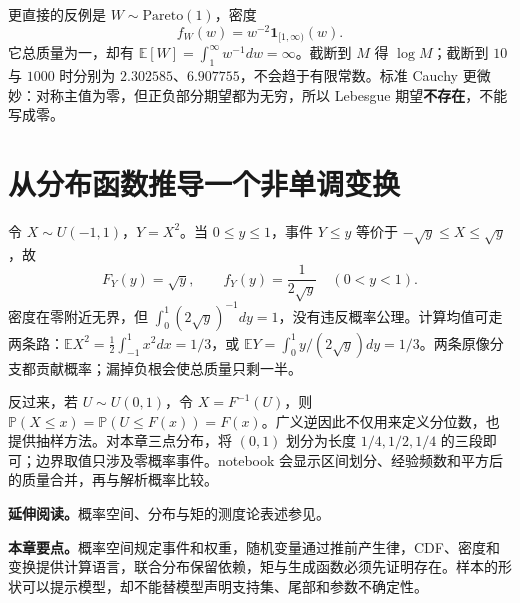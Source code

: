 更直接的反例是 $W\sim\mathrm{Pareto}(1)$，密度
\[
 f_W(w)=w^{-2}\mathbf1_{[1,\infty)}(w).
\]
它总质量为一，却有 $\mathbb E[W]=\int_1^\infty w^{-1}dw=\infty$。截断到 $M$ 得 $\log M$；截断到 $10$ 与 $1000$ 时分别为 $2.302585$、$6.907755$，不会趋于有限常数。标准 Cauchy 更微妙：对称主值为零，但正负部分期望都为无穷，所以 Lebesgue 期望\textbf{不存在}，不能写成零。

\section{从分布函数推导一个非单调变换}
令 $X\sim U(-1,1)$，$Y=X^2$。当 $0\leq y\leq1$，事件 $Y\leq y$ 等价于 $-\sqrt y\leq X\leq\sqrt y$，故
\[
 F_Y(y)=\sqrt y,\qquad f_Y(y)=\frac1{2\sqrt y}\quad(0<y<1).
\]
密度在零附近无界，但 $\int_0^1(2\sqrt y)^{-1}dy=1$，没有违反概率公理。计算均值可走两条路：$\mathbb EX^2=\frac12\int_{-1}^1x^2dx=1/3$，或 $\mathbb EY=\int_0^1y/(2\sqrt y)dy=1/3$。两条原像分支都贡献概率；漏掉负根会使总质量只剩一半。

反过来，若 $U\sim U(0,1)$，令 $X=F^{-1}(U)$，则 $\mathbb P(X\leq x)=\mathbb P(U\leq F(x))=F(x)$。广义逆因此不仅用来定义分位数，也提供抽样方法。对本章三点分布，将 $(0,1)$ 划分为长度 $1/4,1/2,1/4$ 的三段即可；边界取值只涉及零概率事件。notebook 会显示区间划分、经验频数和平方后的质量合并，再与解析概率比较。

\noindent\textbf{延伸阅读。}概率空间、分布与矩的测度论表述参见\cite{billingsley1995probability}。




\noindent\textbf{本章要点。}概率空间规定事件和权重，随机变量通过推前产生律，CDF、密度和变换提供计算语言，联合分布保留依赖，矩与生成函数必须先证明存在。样本的形状可以提示模型，却不能替模型声明支持集、尾部和参数不确定性。
